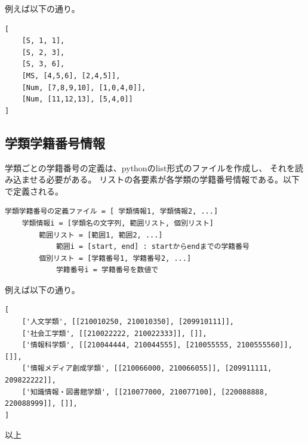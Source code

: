例えば以下の通り。
\begin{tcolorbox}[enhanced jigsaw,breakable,colframe=\mycolor ,colback=white,colbacktitle=\mycolor ,coltitle=white,fonttitle=\bfseries\sffamily,title=正解定義ファイルの例]

\begin{verbatim}
[
    [S, 1, 1],
    [S, 2, 3],
    [S, 3, 6],
    [MS, [4,5,6], [2,4,5]],
    [Num, [7,8,9,10], [1,0,4,0]],
    [Num, [11,12,13], [5,4,0]]
]
\end{verbatim}

\end{tcolorbox}

\subsection{学類学籍番号情報}
\label{gakurui-info}

学類ごとの学籍番号の定義は、pythonのlist形式のファイルを作成し、
それを読み込ませる必要がある。
リストの各要素が各学類の学籍番号情報である。以下で定義される。
\begin{tcolorbox}[enhanced jigsaw,breakable,colframe=\mycolor ,colback=white,colbacktitle=\mycolor ,coltitle=white,fonttitle=\bfseries\sffamily]

\begin{verbatim}
学類学籍番号の定義ファイル = [ 学類情報1, 学類情報2, ...]
    学類情報i = [学類名の文字列, 範囲リスト, 個別リスト]
        範囲リスト = [範囲1, 範囲2, ...]
            範囲i = [start, end] : startからendまでの学籍番号
        個別リスト = [学籍番号1, 学籍番号2, ...]
            学籍番号i = 学籍番号を数値で
\end{verbatim}

\end{tcolorbox}
例えば以下の通り。
\begin{tcolorbox}[enhanced jigsaw,breakable,colframe=\mycolor ,colback=white,colbacktitle=\mycolor ,coltitle=white,fonttitle=\bfseries\sffamily,title=学類学籍番号情報定義]

\begin{verbatim}
[
    ['人文学類', [[210010250, 210010350], [209910111]],
    ['社会工学類', [[210022222, 210022333]], []],
    ['情報科学類', [[210044444, 210044555], [210055555, 2100555560]], []],
    ['情報メディア創成学類', [[210066000, 210066055]], [209911111, 209822222]],
    ['知識情報・図書館学類', [[210077000, 210077100], [220088888, 220088999]], []],
] 
\end{verbatim}

\end{tcolorbox}

\hfill  以上


